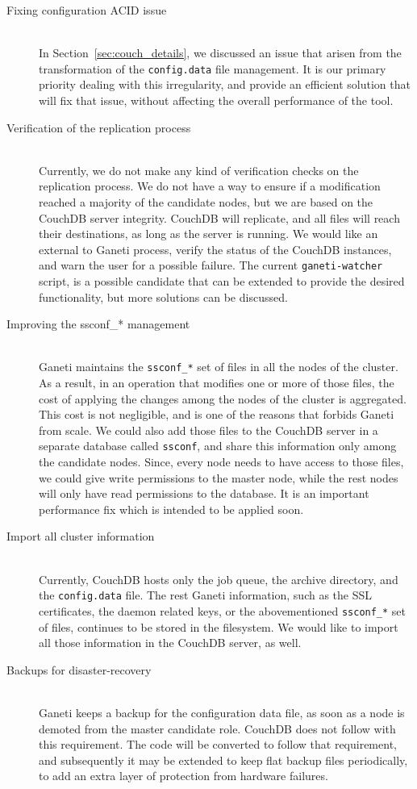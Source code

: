 \begin{description}
  \item[Fixing configuration ACID issue] \hfill \\
    In Section~\ref{sec:couch_details}, we discussed an issue that arisen from
    the transformation of the \texttt{config.data} file management. It is
    our primary priority dealing with this irregularity, and provide an
    efficient solution that will fix that issue, without affecting the overall
    performance of the tool.
  \item[Verification of the replication process] \hfill \\
    Currently, we do not make any kind of verification checks on the replication
    process. We do not have a way to ensure if a modification reached a majority
    of the candidate nodes, but we are based on the CouchDB server integrity.
    CouchDB will replicate, and all files will reach their destinations, as
    long as the server is running. We would like an external to Ganeti process,
    verify the status of the CouchDB instances, and warn the user for a possible
    failure. The current \texttt{ganeti-watcher} script, is a possible candidate
    that can be extended to provide the desired functionality, but more
    solutions can be discussed.
  \item[Improving the ssconf\_* management] \hfill \\
    Ganeti maintains the \texttt{ssconf\_*} set of files in all the nodes of the
    cluster. As a result, in an operation that modifies one or more of those
    files, the cost of applying the changes among the nodes of the cluster is
    aggregated. This cost is not negligible, and is one of the reasons that
    forbids Ganeti from scale. We could also add those files to the CouchDB
    server in a separate database called \texttt{ssconf}, and share this
    information only among the candidate nodes. Since, every node needs to have
    access to those files, we could give write permissions to the master node,
    while the rest nodes will only have read permissions to the database. It is
    an important performance fix which is intended to be applied soon.
  \item[Import all cluster information] \hfill \\
    Currently, CouchDB hosts only the job queue, the archive directory, and the
    \texttt{config.data} file. The rest Ganeti information, such as the SSL
    certificates, the daemon related keys, or the abovementioned
    \texttt{ssconf\_*} set of files, continues to be stored in the filesystem.
    We would like to import all those information in the CouchDB server, as
    well.
  \item[Backups for disaster-recovery] \hfill \\
    Ganeti keeps a backup for the configuration data file, as soon as a node is
    demoted from the master candidate role. CouchDB does not follow with this
    requirement. The code will be converted to follow that requirement, and
    subsequently it may be extended to keep flat backup files periodically, to
    add an extra layer of protection from hardware failures.
\end{description}

